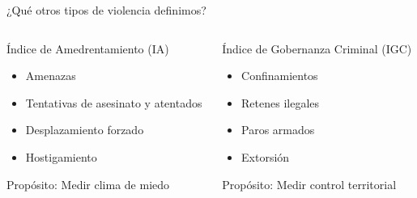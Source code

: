 \begin{frame}{¿Qué otros tipos de violencia definimos?}
    \begin{columns}[T]
        \begin{column}{0.48\textwidth}
            \begin{block}{Índice de Amedrentamiento (IA)}
                \begin{itemize}
                        \item Amenazas
                        \item Tentativas de asesinato y atentados
                        \item Desplazamiento forzado
                        \item Hostigamiento

                \end{itemize}
                \alert{Propósito}: Medir clima de miedo
            \end{block}
        \end{column}
        
        \begin{column}{0.48\textwidth}
            \begin{block}{Índice de Gobernanza Criminal (IGC)}

                    \begin{itemize}
                        \item Confinamientos
                        \item Retenes ilegales
                        \item Paros armados
                        \item Extorsión
                    \end{itemize}
                    \alert{Propósito}: Medir control territorial

            \end{block}
        \end{column}
    \end{columns}
\end{frame}

